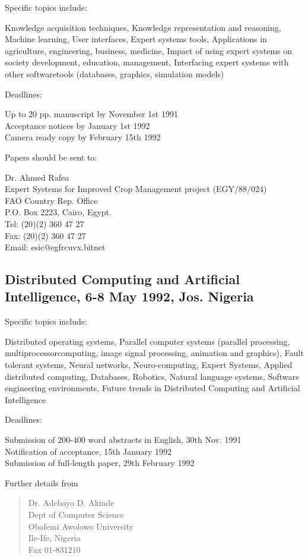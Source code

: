 Specific topics include:

Knowledge acquisition techniques, Knowledge representation and
reasoning, Machine learning, User interfaces, Expert systems tools,
Applications in agriculture, engineering, business, medicine, Impact
of using expert systems on society development, education, management,
Interfacing expert systems with other softwaretools (databases,
graphics, simulation models) 

Deadlines:

Up to 20 pp. manuscript by November 1st 1991\\
Acceptance notices by January 1st 1992\\
Camera ready copy by February 15th 1992

Papers should be sent to:

Dr. Ahmed Rafea\\
Expert Systems for Improved Crop Management project (EGY/88/024)\\
FAO Country Rep. Office\\
P.O. Box 2223, Cairo, Egypt.\\
Tel: (20)(2) 360 47 27\\
Fax: (20)(2) 360 47 27\\
Email: esic@egfrcuvx.bitnet

\subsection{Distributed Computing and Artificial Intelligence, 6-8 May
1992, Jos. Nigeria}
Specific topics include:

Distributed operating systems, Parallel computer systems (parallel
processing, multiprocessorcomputing, image signal processing,
animation and graphics), Fault tolerant systems, Neural networks,
Neuro-computing, Expert Systems, Applied distributed computing,
Databases, Robotics, Natural language systems, Software engineering
environments, Future trends in Distributed Computing and Artificial
Intelligence  

Deadlines:

Submission of 200-400 word abstracts in English, 30th Nov. 1991\\
Notification of acceptance, 15th January 1992\\
Submission of full-length paper, 29th February 1992

Further details from
\begin{verse} 
Dr. Adebayo D. Akinde\\
Dept of Computer Science\\
Obafemi Awolowo University\\
Ile-Ife, Nigeria\\
Fax 01-831210
\end{verse}

